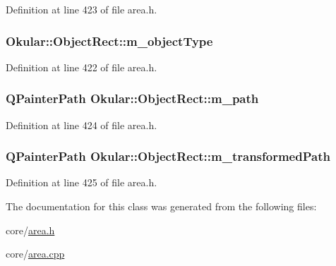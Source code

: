 Definition at line 423 of file area.\+h.

\hypertarget{classOkular_1_1ObjectRect_a2ba33c1a9406f232e21870a264e2ac7b}{
\subsubsection[{m\+\_\+object\+Type}]{ Okular\+::\+Object\+Rect\+::m\+\_\+object\+Type\hspace{0.3cm}{\ttfamily [protected]}}}\label{classOkular_1_1ObjectRect_a2ba33c1a9406f232e21870a264e2ac7b}


Definition at line 422 of file area.\+h.

\hypertarget{classOkular_1_1ObjectRect_a92f00ded61bc665991952b8d66d415eb}{
\subsubsection[{m\+\_\+path}]{\setlength{\rightskip}{0pt plus 5cm}Q\+Painter\+Path Okular\+::\+Object\+Rect\+::m\+\_\+path\hspace{0.3cm}{\ttfamily [protected]}}}\label{classOkular_1_1ObjectRect_a92f00ded61bc665991952b8d66d415eb}


Definition at line 424 of file area.\+h.

\hypertarget{classOkular_1_1ObjectRect_a2df8a0dd35a6097de4058b68fd5b8dad}{
\subsubsection[{m\+\_\+transformed\+Path}]{\setlength{\rightskip}{0pt plus 5cm}Q\+Painter\+Path Okular\+::\+Object\+Rect\+::m\+\_\+transformed\+Path\hspace{0.3cm}{\ttfamily [protected]}}}\label{classOkular_1_1ObjectRect_a2df8a0dd35a6097de4058b68fd5b8dad}


Definition at line 425 of file area.\+h.



The documentation for this class was generated from the following files\+:\begin{DoxyCompactItemize}
\item 
core/\hyperlink{area_8h}{area.\+h}\item 
core/\hyperlink{area_8cpp}{area.\+cpp}\end{DoxyCompactItemize}
